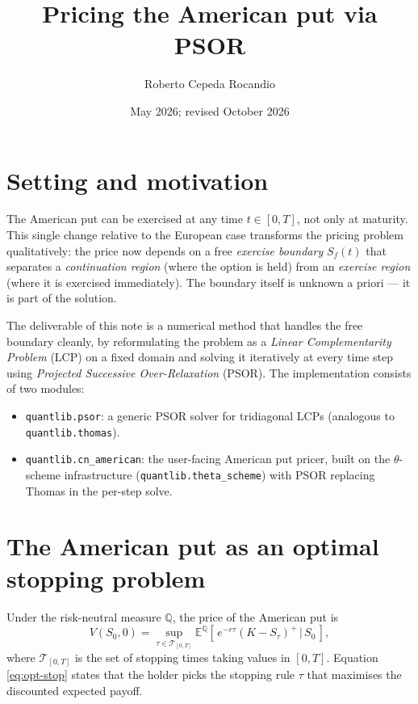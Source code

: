 \documentclass[11pt,a4paper]{article}
\title{Pricing the American put via PSOR}
\author{Roberto Cepeda Rocandio}
\date{May 2026; revised October 2026}
\begin{document}
\maketitle

\section{Setting and motivation}

The American put can be exercised at any time $t \in [0, T]$, not
only at maturity. This single change relative to the European case
transforms the pricing problem qualitatively: the price now depends
on a free \emph{exercise boundary} $S_f(t)$ that separates a
\emph{continuation region} (where the option is held) from an
\emph{exercise region} (where it is exercised immediately). The
boundary itself is unknown a priori --- it is part of the solution.

The deliverable of this note is a numerical method that handles the
free boundary cleanly, by reformulating the problem as a
\emph{Linear Complementarity Problem} (LCP) on a fixed domain and
solving it iteratively at every time step using \emph{Projected
Successive Over-Relaxation} (PSOR). The implementation consists of two modules:
\begin{itemize}[leftmargin=2em]
\item \texttt{quantlib.psor}: a generic PSOR solver for tridiagonal
LCPs (analogous to \texttt{quantlib.thomas}).
\item \texttt{quantlib.cn\_american}: the user-facing American put
pricer, built on the $\theta$-scheme infrastructure (\texttt{quantlib.theta\_scheme}) with
PSOR replacing Thomas in the per-step solve.
\end{itemize}

\section{The American put as an optimal stopping problem}

Under the risk-neutral measure $\mathbb{Q}$, the price of the
American put is
\begin{equation}
V(S_0, 0) = \sup_{\tau \in \mathcal{T}_{[0,T]}}
\mathbb{E}^{\mathbb{Q}}\!\left[\,e^{-r\tau}(K - S_\tau)^+ \,\big|\,
S_0\,\right],
\label{eq:opt-stop}
\end{equation}
where $\mathcal{T}_{[0,T]}$ is the set of stopping times taking
values in $[0, T]$. Equation \eqref{eq:opt-stop} states that the
holder picks the stopping rule $\tau$ that maximises the discounted
expected payoff.
\end{document}
